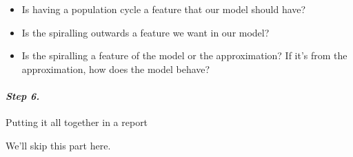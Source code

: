 \begin{example}
\begin{itemize}
	\item Is having a population cycle a feature that our model should have?
	\item Is the spiralling outwards a feature we want in our model?
	\item Is the spiralling a feature of the model or the approximation? If it's from the approximation, how does the model behave?
\end{itemize}

\end{example}



\paragraph{\emph{Step 6.}} Putting it all together in a report

We'll skip this part here.




